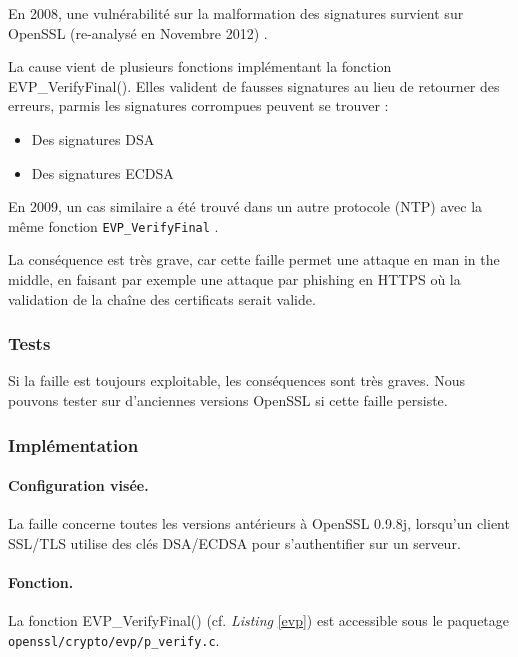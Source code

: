 		En 2008, une vulnérabilité sur la malformation des signatures survient sur OpenSSL (re-analysé en Novembre 2012) \cite{openssl2009secadv} \cite{cve-2008-5077}. 

		La cause vient de plusieurs fonctions implémentant la fonction EVP\_VerifyFinal(). Elles valident de fausses signatures au lieu de retourner des erreurs, parmis les signatures corrompues peuvent se trouver :
		\begin{itemize}
		\item Des signatures DSA
		\item Des signatures ECDSA
		\end{itemize}

		En 2009, un cas similaire a été trouvé dans un autre protocole (NTP) avec la même fonction \texttt{EVP\_VerifyFinal} \cite{cve-2009-0021}.

		La conséquence est très grave, car cette faille permet une attaque en man in the middle, en faisant par exemple une attaque par phishing en HTTPS où la validation de la chaîne des certificats serait valide.

		\subsubsection{Tests}

		Si la faille est toujours exploitable, les conséquences sont très graves. Nous pouvons tester sur d'anciennes versions OpenSSL si cette faille persiste.
		
		\subsubsection{Implémentation}
			
			\paragraph{Configuration visée.\\}
			
			La faille concerne toutes les versions antérieurs à OpenSSL 0.9.8j, lorsqu'un client SSL/TLS utilise des clés DSA/ECDSA pour s'authentifier sur un serveur. 

			\paragraph{Fonction.\\}
			La fonction EVP\_VerifyFinal() (cf. \textit{Listing} \ref{evp}) est accessible sous le paquetage \texttt{openssl/crypto/evp/p\_verify.c}.
		
